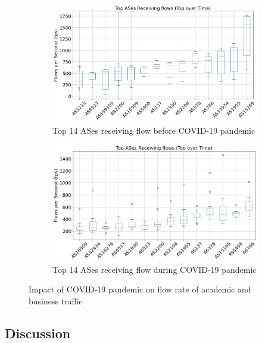 \documentclass[10pt, journal, letterpaper]{IEEEtran}
\newcommand\figSzeMahdi{0.8}
\begin{document}
\begin{figure}
    \begin{subfigure}{\figSzeMahdi\columnwidth}
          \centering
          \includegraphics[width=\columnwidth]{img/BCO2_top14AS_recieving_fps.png}
          \caption{Top 14 ASes receiving flow before COVID-19 pandemic}
          \label{fig:BCO2_topAS_rec_fps}
    \end{subfigure}
    \begin{subfigure}{\figSzeMahdi\columnwidth}
          \centering
          \includegraphics[width=\columnwidth]{img/CO2_top14AS_recieving_fps.png}
          \caption{Top 14 ASes receiving flow during COVID-19 pandemic}
          \label{fig:CO2_topAS_rec_fps}
    \end{subfigure}
    \caption{Impact of COVID-19 pandemic on flow rate of academic and business traffic}
    \label{fig:flowrate_topAS_rec_BCO_CO}
\end{figure}
\subsection{Discussion}
\end{document}

